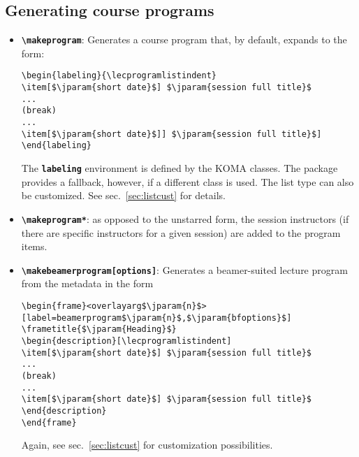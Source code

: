 \documentclass[english]{article}
\newcommand*\jmacro[1]{\textbf{\texttt{#1}}}
\newcommand*\jcsmacro[1]{\jmacro{\textbackslash{#1}}}
\newcommand*\jparam[1]{\angus #1\angud}
\begin{document}
\subsection{Generating course programs}\label{subsec:genprog}
\label{sec:lecprog}
\begin{itemize}
\item \jcsmacro{makeprogram}: Generates a course program that, by default,
expands to the form:
\begin{lstlisting}[language={[LaTeX]TeX},basicstyle={\small\ttfamily},
                   frame=single,escapechar=\$]
\begin{labeling}{\lecprogramlistindent}
\item[$\jparam{short date}$] $\jparam{session full title}$
...
(break)
...
\item[$\jparam{short date}$]] $\jparam{session full title}$]
\end{labeling}
\end{lstlisting}

The \jmacro{labeling} environment is defined by the KOMA classes.
The package provides a fallback, however, if a different class is used.
The list type can also be customized. See sec.~\ref{sec:listcust} for details.

\item \jcsmacro{makeprogram*}: as opposed to the unstarred form, the session instructors
(if there are specific instructors for a given session) are added to the program items.

\item \jcsmacro{makebeamerprogram[\jparam{options}]}: Generates
a beamer-suited lecture program from the metadata in the form
\begin{lstlisting}[language={[LaTeX]TeX},basicstyle={\small\ttfamily},
                   frame=single,escapechar=\$,moretexcs={[1]{frametitle}}]
\begin{frame}<overlayarg$\jparam{n}$>[label=beamerprogram$\jparam{n}$,$\jparam{bfoptions}$]
\frametitle{$\jparam{Heading}$}
\begin{description}[\lecprogramlistindent]
\item[$\jparam{short date}$] $\jparam{session full title}$
...
(break)
...
\item[$\jparam{short date}$] $\jparam{session full title}$
\end{description}
\end{frame}
\end{lstlisting}

Again, see sec.~\ref{sec:listcust} for customization possibilities.


\end{itemize}
\end{document}
